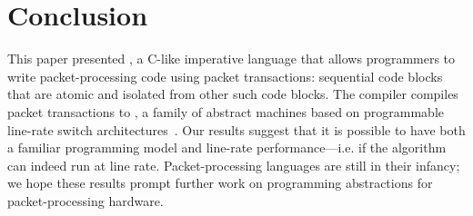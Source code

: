 \section{Conclusion}
\label{s:conclusion}

This paper presented \pktlanguage, a C-like imperative language that allows
programmers to write packet-processing code using packet transactions:
sequential code blocks that are atomic and isolated from other such code
blocks. The \pktlanguage compiler compiles packet transactions to \absmachine,
a family of abstract machines based on programmable line-rate switch
architectures~\cite{flexpipe, xpliant, rmt}. Our results suggest that it is
possible to have both a familiar programming model and line-rate
performance---i.e. if the algorithm can indeed run at line rate.
Packet-processing languages are still in their infancy; we hope these results
prompt further work on programming abstractions for packet-processing hardware.

